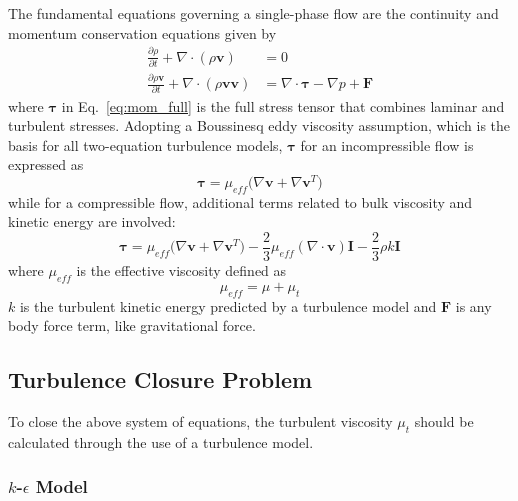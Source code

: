 \documentclass[12pt]{extarticle}
\newcommand{\<}{\langle}
\renewcommand{\>}{\rangle}
\theoremstyle{definition}
\begin{document}
The fundamental equations governing a single-phase flow are the continuity and momentum conservation equations given by
\begin{align}
\frac{\partial\rho}{\partial t} + \nabla \cdot (\rho \textbf{v}) &= 0 \label{eq:cont_full} \\
\frac{\partial \rho \textbf{v}}{\partial t} + \nabla \cdot (\rho \textbf{v} \textbf{v}) &= \nabla \cdot \boldsymbol{\tau} - \nabla p + \textbf{F}\label{eq:mom_full}
\end{align}
where $\boldsymbol{\tau}$ in Eq.~\ref{eq:mom_full} is the full stress tensor that combines laminar and turbulent stresses. Adopting a Boussinesq eddy viscosity assumption, which is the basis for all two-equation turbulence models, $\boldsymbol{\tau}$ for an incompressible flow is expressed as
\begin{equation}
     \boldsymbol{\tau} = \mu_{eff} \big(\nabla \textbf{v}+\nabla \textbf{v}^{T}\big)
\end{equation}
while for a compressible flow, additional terms related to bulk viscosity and kinetic energy are involved:
\begin{equation}
     \boldsymbol{\tau} = \mu_{eff} \big(\nabla \textbf{v}+\nabla \textbf{v}^{T}\big) - \frac{2}{3} \mu_{eff} (\nabla \cdot \textbf{v}) \textbf{I} - \frac{2}{3} \rho k \textbf{I}
\end{equation}
where $\mu_{eff}$ is the effective viscosity defined as
\begin{equation}  
\mu_{eff} = \mu+\mu_t
\end{equation}
$k$ is the turbulent kinetic energy predicted by a turbulence model and $\textbf{F}$ is any body force term, like gravitational force.

\subsection{Turbulence Closure Problem}
To close the above system of equations, the turbulent viscosity $\mu_t$ should be calculated through the use of a turbulence model. 

\subsubsection{$k$-$\epsilon$ Model}
\end{document}
